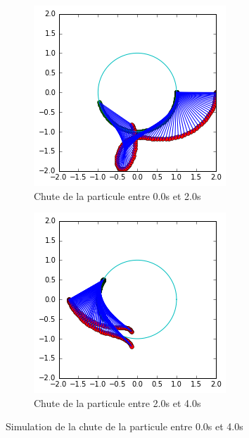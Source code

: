 \documentclass[10pt]{article}
\begin{document}
\begin{figure}[h]
 \centering
 \begin{subfigure}{0.4\textwidth}
  \includegraphics[width=\textwidth]{../fig/fig.png}
  \caption{Chute de la particule entre 0.0s et 2.0s}
 \end{subfigure}
 \begin{subfigure}{0.4\textwidth}
  \includegraphics[width=\textwidth]{../fig/fig2.png}
  \caption{Chute de la particule entre 2.0s et 4.0s}
 \end{subfigure}
\caption{Simulation de la chute de la particule entre 0.0s et 4.0s}
\end{figure}
\end{document}
